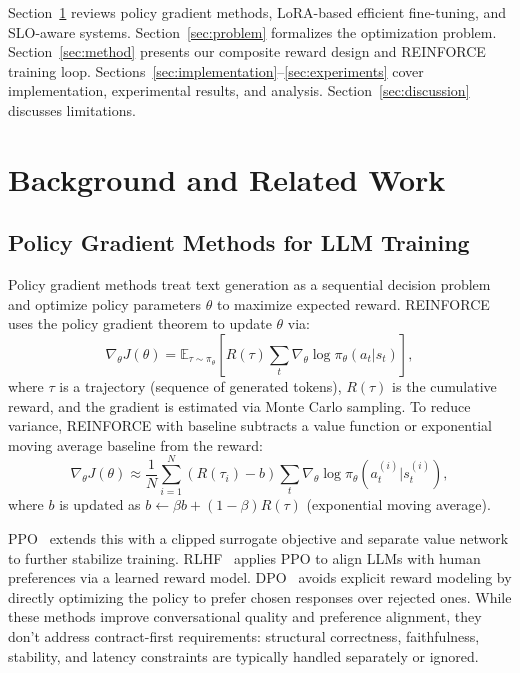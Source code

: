 \documentclass[11pt]{article}
\begin{document}
Section~\ref{sec:background} reviews policy gradient methods, LoRA-based efficient fine-tuning, and SLO-aware systems.
Section~\ref{sec:problem} formalizes the optimization problem.
Section~\ref{sec:method} presents our composite reward design and REINFORCE training loop.
Sections~\ref{sec:implementation}--\ref{sec:experiments} cover implementation, experimental results, and analysis.
Section~\ref{sec:discussion} discusses limitations.

\section{Background and Related Work}
\label{sec:background}

\subsection{Policy Gradient Methods for LLM Training}

Policy gradient methods treat text generation as a sequential decision problem and optimize policy parameters $\theta$ to maximize expected reward.
REINFORCE~\citep{williams1992reinforce} uses the policy gradient theorem to update $\theta$ via:
\begin{equation}
\nabla_\theta J(\theta) = \mathbb{E}_{\tau \sim \pi_\theta} \left[ R(\tau) \sum_{t} \nabla_\theta \log \pi_\theta(a_t | s_t) \right],
\end{equation}
where $\tau$ is a trajectory (sequence of generated tokens), $R(\tau)$ is the cumulative reward, and the gradient is estimated via Monte Carlo sampling.
To reduce variance, REINFORCE with baseline subtracts a value function or exponential moving average baseline from the reward:
\begin{equation}
\nabla_\theta J(\theta) \approx \frac{1}{N} \sum_{i=1}^{N} (R(\tau_i) - b) \sum_{t} \nabla_\theta \log \pi_\theta(a_t^{(i)} | s_t^{(i)}),
\end{equation}
where $b$ is updated as $b \leftarrow \beta b + (1-\beta) R(\tau)$ (exponential moving average).

PPO~\citep{schulman2017ppo} extends this with a clipped surrogate objective and separate value network to further stabilize training.
RLHF~\citep{ouyang2022rlhf} applies PPO to align LLMs with human preferences via a learned reward model.
DPO~\citep{rafailov2023dpo} avoids explicit reward modeling by directly optimizing the policy to prefer chosen responses over rejected ones.
While these methods improve conversational quality and preference alignment, they don't address contract-first requirements: structural correctness, faithfulness, stability, and latency constraints are typically handled separately or ignored.
\end{document}
